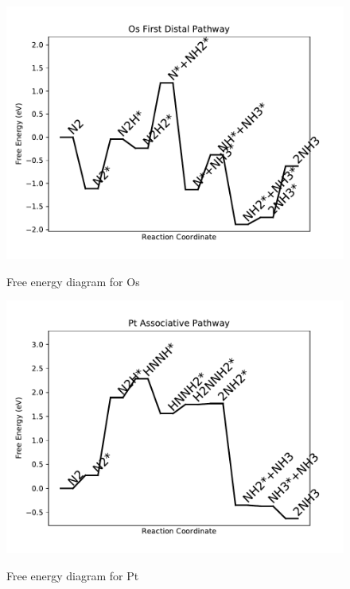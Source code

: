 \documentclass{article}
\begin{document}
\newpage
\begin{figure}
\includegraphics[width=1\linewidth]{data/plots/Os_distal_1.pdf}
\label{fig:Os_distal_1}
\caption{Free energy diagram for Os}
\end{figure}

\begin{figure}
\includegraphics[width=1\linewidth]{data/plots/Pt_associative.pdf}
\label{fig:Pt_associative}
\caption{Free energy diagram for Pt}
\end{figure}
\end{document}
